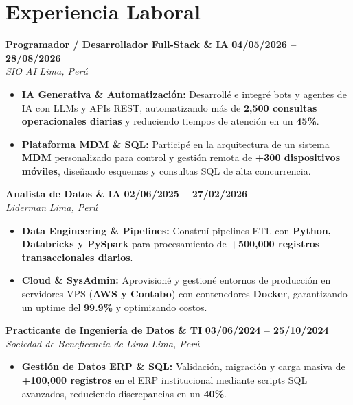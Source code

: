 \documentclass[10pt, a4paper]{article}
\newcommand{\entryheader}[4]{%
  \noindent\textbf{#1} \hfill \textbf{#2}\\
  \noindent\textit{#3} \hfill \textit{#4}\par
  \vspace{0.08em}
}
\begin{document}
\section{Experiencia Laboral}

\entryheader{Programador / Desarrollador Full-Stack \& IA}{04/05/2026 -- 28/08/2026}{SIO AI}{Lima, Perú}
\begin{itemize}
    \item \textbf{IA Generativa \& Automatización:} Desarrollé e integré bots y agentes de IA con LLMs y APIs REST, automatizando más de \textbf{2,500 consultas operacionales diarias} y reduciendo tiempos de atención en un \textbf{45\%}.
    \item \textbf{Plataforma MDM \& SQL:} Participé en la arquitectura de un sistema \textbf{MDM} personalizado para control y gestión remota de \textbf{+300 dispositivos móviles}, diseñando esquemas y consultas SQL de alta concurrencia.
\end{itemize}

\vspace{0.2em}

\entryheader{Analista de Datos \& IA}{02/06/2025 -- 27/02/2026}{Liderman}{Lima, Perú}
\begin{itemize}
    \item \textbf{Data Engineering \& Pipelines:} Construí pipelines ETL con \textbf{Python, Databricks y PySpark} para procesamiento de \textbf{+500,000 registros transaccionales diarios}.
    \item \textbf{Cloud \& SysAdmin:} Aprovisioné y gestioné entornos de producción en servidores VPS (\textbf{AWS y Contabo}) con contenedores \textbf{Docker}, garantizando un uptime del \textbf{99.9\%} y optimizando costos.
\end{itemize}

\vspace{0.2em}

\entryheader{Practicante de Ingeniería de Datos \& TI}{03/06/2024 -- 25/10/2024}{Sociedad de Beneficencia de Lima}{Lima, Perú}
\begin{itemize}
    \item \textbf{Gestión de Datos ERP \& SQL:} Validación, migración y carga masiva de \textbf{+100,000 registros} en el ERP institucional mediante scripts SQL avanzados, reduciendo discrepancias en un \textbf{40\%}.
\end{itemize}

\vspace{0.2em}
\end{document}
